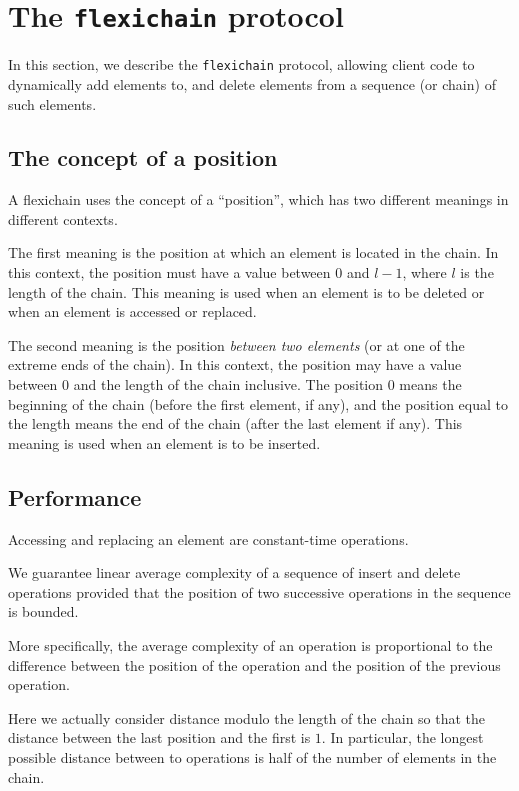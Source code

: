 \documentclass[11pt]{article}
\begin{document}
\section{The \texttt{flexichain} protocol}

In this section, we describe the \texttt{flexichain} protocol,
allowing client code to dynamically add elements to, and delete
elements from a sequence (or chain) of such elements.

\subsection{The concept of a position}

A flexichain uses the concept of a ``position'', which has two
different meanings in different contexts.

The first meaning is the position at which an element is located in
the chain.  In this context, the position must have a value between 0
and $l-1$, where $l$ is the length of the chain.  This meaning is used
when an element is to be deleted or when an element is accessed or
replaced.

The second meaning is the position \textit{between two
elements} (or at one of the extreme ends of the chain).
In this context, the position may have a value between 0 and the
length of the chain inclusive. The position 0 means the beginning of
the chain (before the first element, if any), and the
position equal to the length means the end of the chain
(after the last element if any).  This meaning is used when an element
is to be inserted.

\subsection{Performance}

Accessing and replacing an element are constant-time operations.

We guarantee linear average complexity of a sequence of insert and
delete operations provided that the position of two successive
operations in the sequence is bounded.

More specifically, the average complexity of an operation is
proportional to the difference between the position of the operation
and the position of the previous operation.

Here we actually consider distance modulo the length of the chain so
that the distance between the last position and the first is $1$.
In particular, the longest possible distance between to operations is
half of the number of elements in the chain.
\end{document}
